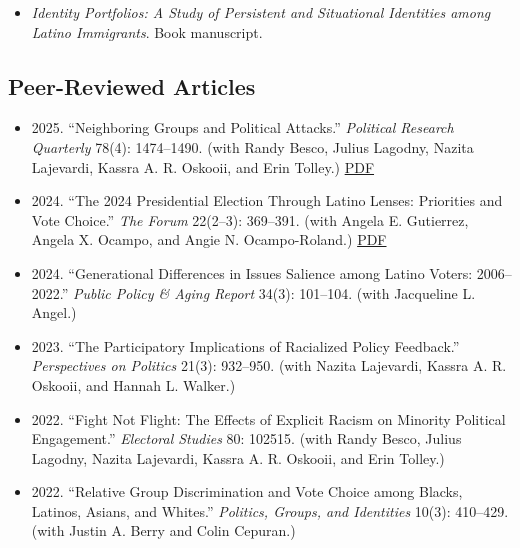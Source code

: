 \documentclass[11pt,letterpaper]{moderncv}
\newcommand{\faFilePdf}[1][]{PDF}
\begin{document}
\begin{itemize}
\item \textit{Identity Portfolios: A Study of Persistent and Situational Identities among Latino Immigrants}. Book manuscript.\\
\end{itemize}

\clearpage
\subsection{Peer-Reviewed Articles}


\begin{itemize}
\setlength{\itemsep}{5pt}
\item 2025. ``Neighboring Groups and Political Attacks.'' \textit{Political Research Quarterly} 78(4): 1474--1490. (with Randy Besco, Julius Lagodny, Nazita Lajevardi, Kassra A. R. Oskooii, and Erin Tolley.) \href{https://sergiogarciarios.com/CV/publications/neighboring-groups-and-political-attacks.pdf}{\textcolor{myblue}{\faFilePdf[regular]}} \\
\item 2024. ``The 2024 Presidential Election Through Latino Lenses: Priorities and Vote Choice.'' \textit{The Forum} 22(2--3): 369--391. (with Angela E. Gutierrez, Angela X. Ocampo, and Angie N. Ocampo-Roland.) \href{https://sergiogarciarios.com/CV/publications/2024-presidential-election-latino-lenses.pdf}{\textcolor{myblue}{\faFilePdf[regular]}} \\

\item 2024. ``Generational Differences in Issues Salience among Latino Voters: 2006--2022.'' \textit{Public Policy \& Aging Report} 34(3): 101--104. (with Jacqueline L. Angel.) \\

\item 2023. ``The Participatory Implications of Racialized Policy Feedback.'' \textit{Perspectives on Politics} 21(3): 932--950. (with Nazita Lajevardi, Kassra A. R. Oskooii, and Hannah L. Walker.) \\

\item 2022. ``Fight Not Flight: The Effects of Explicit Racism on Minority Political Engagement.'' \textit{Electoral Studies} 80: 102515. (with Randy Besco, Julius Lagodny, Nazita Lajevardi, Kassra A. R. Oskooii, and Erin Tolley.) \\

\item 2022. ``Relative Group Discrimination and Vote Choice among Blacks, Latinos, Asians, and Whites.'' \textit{Politics, Groups, and Identities} 10(3): 410--429. (with Justin A. Berry and Colin Cepuran.) \\



\end{itemize}
\end{document}
